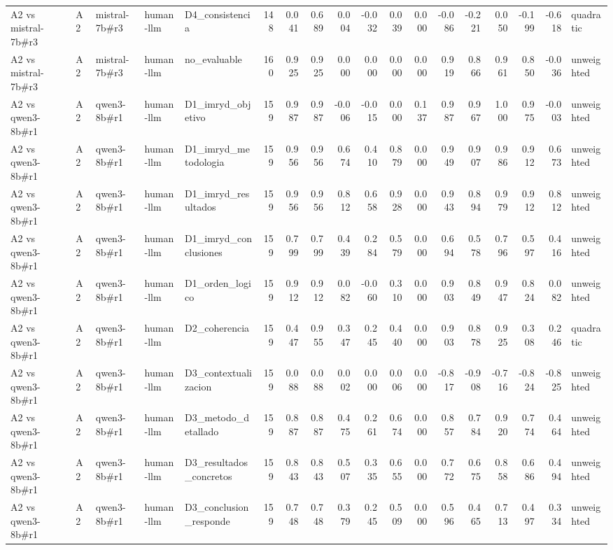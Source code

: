 \begin{table}
{\begin{tabular}{lllllrrrrrrrrrrrrl}
A2 vs mistral-7b\#r3 & A2 & mistral-7b\#r3 & human-llm & D4\_consistencia & 148 & 0.041 & 0.689 & 0.004 & -0.032 & 0.039 & 0.000 & -0.086 & -0.221 & 0.050 & -0.199 & -0.618 & quadratic \\
A2 vs mistral-7b\#r3 & A2 & mistral-7b\#r3 & human-llm & no\_evaluable & 160 & 0.925 & 0.925 & 0.000 & 0.000 & 0.000 & 0.000 & 0.919 & 0.866 & 0.961 & 0.850 & -0.036 & unweighted \\
A2 vs qwen3-8b\#r1 & A2 & qwen3-8b\#r1 & human-llm & D1\_imryd\_objetivo & 159 & 0.987 & 0.987 & -0.006 & -0.015 & 0.000 & 0.137 & 0.987 & 0.967 & 1.000 & 0.975 & -0.003 & unweighted \\
A2 vs qwen3-8b\#r1 & A2 & qwen3-8b\#r1 & human-llm & D1\_imryd\_metodologia & 159 & 0.956 & 0.956 & 0.674 & 0.410 & 0.879 & 0.000 & 0.949 & 0.907 & 0.986 & 0.912 & 0.673 & unweighted \\
A2 vs qwen3-8b\#r1 & A2 & qwen3-8b\#r1 & human-llm & D1\_imryd\_resultados & 159 & 0.956 & 0.956 & 0.812 & 0.658 & 0.928 & 0.000 & 0.943 & 0.894 & 0.979 & 0.912 & 0.812 & unweighted \\
A2 vs qwen3-8b\#r1 & A2 & qwen3-8b\#r1 & human-llm & D1\_imryd\_conclusiones & 159 & 0.799 & 0.799 & 0.439 & 0.284 & 0.579 & 0.000 & 0.694 & 0.578 & 0.796 & 0.597 & 0.416 & unweighted \\
A2 vs qwen3-8b\#r1 & A2 & qwen3-8b\#r1 & human-llm & D1\_orden\_logico & 159 & 0.912 & 0.912 & 0.082 & -0.060 & 0.310 & 0.000 & 0.903 & 0.849 & 0.947 & 0.824 & 0.082 & unweighted \\
A2 vs qwen3-8b\#r1 & A2 & qwen3-8b\#r1 & human-llm & D2\_coherencia & 159 & 0.447 & 0.955 & 0.347 & 0.245 & 0.440 & 0.000 & 0.903 & 0.878 & 0.925 & 0.308 & 0.246 & quadratic \\
A2 vs qwen3-8b\#r1 & A2 & qwen3-8b\#r1 & human-llm & D3\_contextualizacion & 159 & 0.088 & 0.088 & 0.002 & 0.000 & 0.006 & 0.000 & -0.817 & -0.908 & -0.716 & -0.824 & -0.825 & unweighted \\
A2 vs qwen3-8b\#r1 & A2 & qwen3-8b\#r1 & human-llm & D3\_metodo\_detallado & 159 & 0.887 & 0.887 & 0.475 & 0.261 & 0.674 & 0.000 & 0.857 & 0.784 & 0.920 & 0.774 & 0.464 & unweighted \\
A2 vs qwen3-8b\#r1 & A2 & qwen3-8b\#r1 & human-llm & D3\_resultados\_concretos & 159 & 0.843 & 0.843 & 0.507 & 0.335 & 0.655 & 0.000 & 0.772 & 0.675 & 0.858 & 0.686 & 0.494 & unweighted \\
A2 vs qwen3-8b\#r1 & A2 & qwen3-8b\#r1 & human-llm & D3\_conclusion\_responde & 159 & 0.748 & 0.748 & 0.379 & 0.245 & 0.509 & 0.000 & 0.596 & 0.465 & 0.713 & 0.497 & 0.334 & unweighted \\

\end{tabular}}
\end{table}
